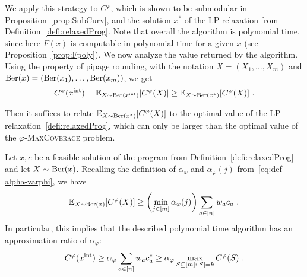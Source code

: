 We apply this strategy to $C^{\varphi}$, which is shown to be submodular in Proposition~\ref{prop:SubCurv}, and the solution $x^*$ of the LP relaxation from Definition~\ref{defi:relaxedProg}. Note that overall the algorithm is polynomial time, since here $F(x)$ is computable in polynomial time for a given $x$ (see Proposition~\ref{prop:Fpoly}). We now analyze the value returned by the algorithm. Using the property of pipage rounding, with the notation $X = (X_1,\ldots,X_m)$ and $\operatorname{\text{Ber}}(x) = (\operatorname{\text{Ber}}(x_1),\ldots,\operatorname{\text{Ber}}(x_m))$, we get
\[ C^{\varphi}(x^{\text{int}}) = \mathbb{E}_{X \sim \operatorname{\text{Ber}}(x^{\text{int}})}[C^{\varphi}(X)] \geq \mathbb{E}_{X \sim \operatorname{\text{Ber}}(x^*)}[C^{\varphi}(X)] \ . \]

Then it suffices to relate $\mathbb{E}_{X \sim \operatorname{\text{Ber}}(x^*)}[C^{\varphi}(X)]$ to the optimal value of the LP relaxation~\ref{defi:relaxedProg}, which can only be larger than the optimal value of the $\varphi$-\textsc{MaxCoverage} problem. 


\begin{theorem}
  Let $x,c$ be a feasible solution of the program from Definition~\ref{defi:relaxedProg} and let $X \sim \operatorname{\text{Ber}}(x)$. Recalling the definition of $\alpha_{\varphi}$ and $\alpha_{\varphi}(j)$ from~\eqref{eq:def-alpha-varphi}, we have
  \[\mathbb{E}_{X \sim \operatorname{\text{Ber}}(x)}[C^{\varphi}(X)] \geq \left(\min_{j \in [m]} \alpha_{\varphi}(j)\right) \sum_{a \in [n]} w_ac_a\ .\]
  In particular, this implies that the described polynomial time algorithm has an approximation ratio of $\alpha_{\varphi}$:
  \[C^{\varphi}(x^{\text{int}}) \geq \alpha_{\varphi} \sum_{a \in [n]} w_ac^*_a \geq \alpha_{\varphi} \max_{S \subseteq [m] : \abs{S} = k} C^{\varphi}(S)\ .\]
  \label{theo:AlgoCard}
\end{theorem}

